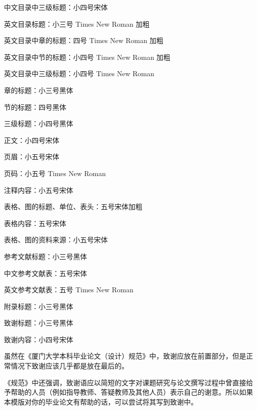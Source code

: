 \documentclass{xmu}
\begin{document}
\begin{appendix}
    中文目录中三级标题：小四号宋体\par
    英文目录标题：小三号 Times New Roman 加粗\par
    英文目录中章的标题：四号 Times New Roman 加粗\par
    英文目录中节的标题：小四号 Times New Roman 加粗\par
    英文目录中三级标题：小四号 Times New Roman\par
    章的标题：小三号黑体\par
    节的标题：四号黑体\par
    三级标题：小四号黑体\par
    正文：小四号宋体\par
    页眉：小五号宋体\par
    页码：小五号 Times New Roman\par
    注释内容：小五号宋体\par
    表格、图的标题、单位、表头：五号宋体加粗\par
    表格内容：五号宋体\par
    表格、图的资料来源：小五号宋体\par
    参考文献标题：小三号黑体\par
    中文参考文献表：五号宋体\par
    英文参考文献表：五号 Times New Roman\par
    附录标题：小三号黑体\par
    致谢标题：小三号黑体\par
    致谢内容：小四号宋体\par
\end{appendix}


\begin{acknowledgement}
    虽然在《厦门大学本科毕业论文（设计）规范》中，致谢应放在前置部分，但是正常情况下致谢应该几乎都是放在最后的。
    \par
    《规范》中还强调，致谢语应以简短的文字对课题研究与论文撰写过程中曾直接给予帮助的人员（例如指导教师、答疑教师及其他人员）表示自己的谢意。所以如果本模版对你的毕业论文有帮助的话，可以尝试将其写到致谢中。
\end{acknowledgement}
\end{document}
